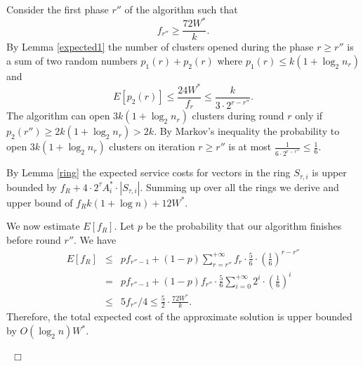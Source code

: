 \documentclass[11pt,twoside]{article}
\newenvironment{proof}{\medskip\noindent {\bf Proof.}}{~\hfill$\Box$\medskip}
\begin{document}
\begin{proof}  Consider the first  phase $r''$ of the algorithm such that 
$$f_{r''}\ge \frac{72W^*}{k}.$$
By Lemma \ref{expected1} the  number of clusters opened  during the  phase $r\ge r''$ is a sum of two random numbers
$p_1(r)+p_2(r)$ where $p_1(r)\le k(1+\log_2n_{r})$ and 
$$E[p_2(r)]\le \frac{24W^*}{f_{r}} \le \frac{k}{3\cdot 2^{r-r''}}.$$
The algorithm can open   $3 k(1+\log_2n_r) $ clusters during round $r$ only if  $p_2(r'')\ge 2 k(1+\log_2n_r)>2k$. By Markov's inequality the probability to open  $3 k(1+\log_2n_r) $ clusters on iteration $r\ge r''$ is at most $\frac{1}{6\cdot 2^{r-r''}}\le \frac{1}{6}$.  

By Lemma \ref{ring} the expected service costs for vectors in the ring $S_{\tau,i}$ is upper bounded by $f_R+ 4\cdot 2^{\tau}A_i^*\cdot |S_{\tau,i}|$. Summing up over all the rings we derive and upper bound of
$f_Rk(1+\log n)+ 12W^*$.

We now estimate $E[f_R]$. Let $p$ be the probability that our algorithm finishes before round $r''$. We have
\begin{eqnarray*}
E[f_R]&\le& p f_{r''-1} + (1-p)\sum_{r=r''}^{+\infty}f_r\cdot \frac56 \cdot \left(\frac16\right)^{r-r''}\\
&=&p f_{r''-1} + (1-p)f_{r''}\cdot \frac56\sum_{i=0}^{+\infty}2^i\cdot \left(\frac16\right)^i\\
&\le& 5f_{r''}/4  \le \frac52 \cdot \frac{72W^*}{k}.
\end{eqnarray*}
 Therefore, the total expected cost of the approximate solution is upper bounded by $O(\log_2 n)W^*$.

\end{proof}

\end{document}
